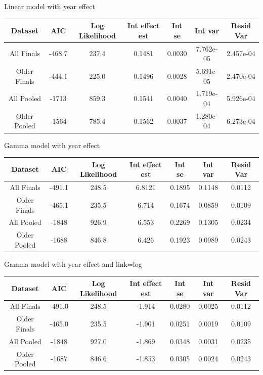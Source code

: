 \documentclass[12pt, letterpaper, titlepage]{article}
\begin{document}
Linear model with year effect
\begin{center}
  \begin{tabular}{|c | c | c | c | c | c | c |} 
   \hline
   Dataset & AIC & Log Likelihood & Int effect est & Int se & Int var & Resid Var \\ [0.5ex] 
   \hline\hline
   All Finals & -468.7 & 237.4 & 0.1481 & 0.0030 & 7.762e-05 & 2.457e-04 \\
   \hline
   Older Finals & -444.1 & 225.0 & 0.1496 & 0.0028 & 5.691e-05 & 2.470e-04 \\ 
   \hline
   All Pooled & -1713 & 859.3 & 0.1541 & 0.0040 & 1.719e-04 & 5.926e-04 \\
   \hline
   Older Pooled & -1564 & 785.4 & 0.1562 & 0.0037 & 1.280e-04 & 6.273e-04 \\
   \hline
  \end{tabular}
  \end{center}

Gamma model with year effect
\begin{center}
  \begin{tabular}{|c | c | c | c | c | c | c |} 
   \hline
   Dataset & AIC & Log Likelihood & Int effect est & Int se & Int var & Resid Var \\ [0.5ex] 
   \hline\hline
   All Finals & -491.1 & 248.5 & 6.8121 & 0.1895 & 0.1148 & 0.0112 \\
   \hline
   Older Finals & -465.1 & 235.5 & 6.714 & 0.1674 & 0.0859 & 0.0109 \\ 
   \hline
   All Pooled & -1848 & 926.9 & 6.553 & 0.2269 & 0.1305 & 0.0234 \\
   \hline
   Older Pooled & -1688 & 846.8 & 6.426 & 0.1923 & 0.0989 & 0.0243 \\
   \hline
  \end{tabular}
  \end{center}

Gamma model with year effect and link=log
\begin{center}
  \begin{tabular}{|c | c | c | c | c | c | c |} 
   \hline
   Dataset & AIC & Log Likelihood & Int effect est & Int se & Int var & Resid Var \\ [0.5ex] 
   \hline\hline
   All Finals & -491.0 & 248.5 & -1.914 & 0.0280 & 0.0025 & 0.0112 \\
   \hline
   Older Finals & -465.0 & 235.5 & -1.901 & 0.0251 & 0.0019 & 0.0109 \\ 
   \hline
   All Pooled & -1848 & 927.0 & -1.869 & 0.0348 & 0.0031 & 0.0235 \\
   \hline
   Older Pooled & -1687 & 846.6 & -1.853 & 0.0305 & 0.0024 & 0.0243 \\
   \hline
  \end{tabular}
  \end{center}
\end{document}
